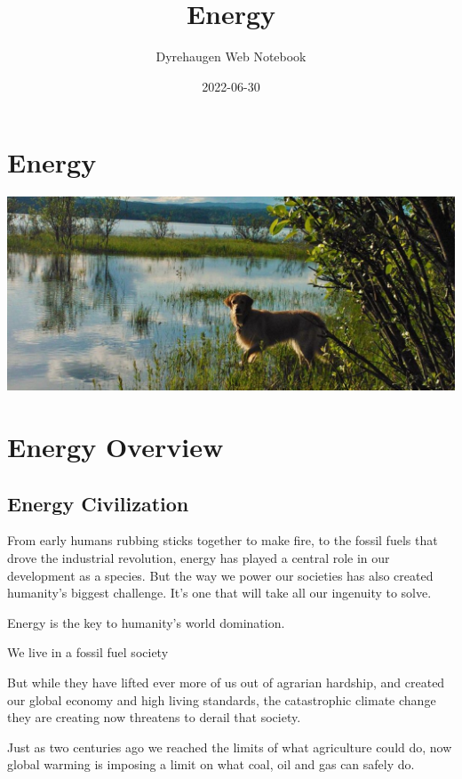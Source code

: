 \documentclass[
]{book}
\title{Energy}
\author{Dyrehaugen Web Notebook}
\date{2022-06-30}
\begin{document}
\maketitle

{
\setcounter{tocdepth}{1}
\tableofcontents
}
\hypertarget{energy}{%
\chapter{Energy}\label{energy}}

\includegraphics{fig/zelda.jpg}

\hypertarget{energy-overview}{%
\chapter{Energy Overview}\label{energy-overview}}

\hypertarget{energy-civilization}{%
\section{Energy Civilization}\label{energy-civilization}}

From early humans rubbing sticks together to make fire, to the fossil fuels that drove the industrial revolution, energy has played a central role in our development as a species. But the way we power our societies has also created humanity's biggest challenge. It's one that will take all our ingenuity to solve.

Energy is the key to humanity's world domination.

We live in a fossil fuel society

But while they have lifted ever more of us out of agrarian hardship, and created our global economy and high living standards, the catastrophic climate change they are creating now threatens to derail that society.

Just as two centuries ago we reached the limits of what agriculture could do, now global warming is imposing a limit on what coal, oil and gas can safely do.
\end{document}
